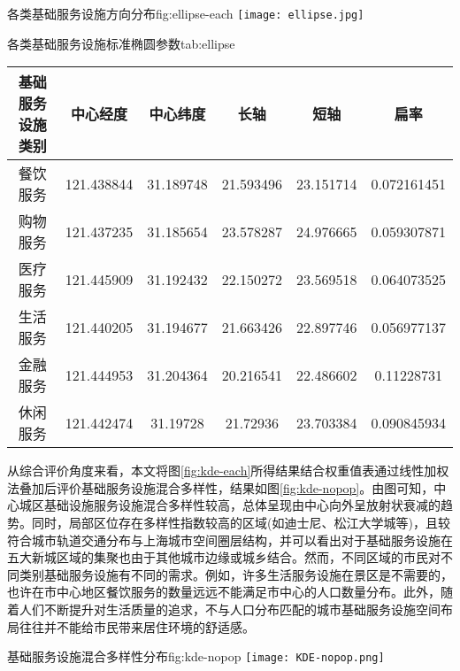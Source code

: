 \documentclass{shnuthesis}
\begin{document}
\begin{generalfig}[htb]{各类基础服务设施方向分布}{fig:ellipse-each}
	\texttt{[image: ellipse.jpg]}
	\setlength{\belowcaptionskip}{1em}   %
\end{generalfig}

\begin{generaltab}[htb]{各类基础服务设施标准椭圆参数}{tab:ellipse}
	\begin{tabularx}{0.92\textwidth}{cccccc}
		\toprule[1.5pt]
		基础服务设施类别 & 中心经度       & 中心纬度      & 长轴       & 短轴       & 扁率          \\
		\midrule
		餐饮服务     & 121.438844 & 31.189748 & 21.593496 & 23.151714 & 0.072161451 \\
		购物服务     & 121.437235 & 31.185654 & 23.578287 & 24.976665 & 0.059307871 \\
		医疗服务     & 121.445909 & 31.192432 & 22.150272 & 23.569518 & 0.064073525 \\
		生活服务     & 121.440205 & 31.194677 & 21.663426 & 22.897746 & 0.056977137 \\
		金融服务     & 121.444953 & 31.204364 & 20.216541 & 22.486602 & 0.11228731  \\
		休闲服务     & 121.442474 & 31.19728  & 21.72936  & 23.703384 & 0.090845934 \\
		\bottomrule[1.5pt]
	\end{tabularx}
\end{generaltab}


从综合评价角度来看，本文将图\ref{fig:kde-each}所得结果结合权重值表通过线性加权法叠加后评价基础服务设施混合多样性，结果如图\ref{fig:kde-nopop}。由图可知，中心城区基础设施服务设施混合多样性较高，总体呈现由中心向外呈放射状衰减的趋势。同时，局部区位存在多样性指数较高的区域(如迪士尼、松江大学城等)，且较符合城市轨道交通分布与上海城市空间圈层结构，并可以看出对于基础服务设施在五大新城区域的集聚也由于其他城市边缘或城乡结合。然而，不同区域的市民对不同类别基础服务设施有不同的需求。例如，许多生活服务设施在景区是不需要的，也许在市中心地区餐饮服务的数量远远不能满足市中心的人口数量分布。此外，随着人们不断提升对生活质量的追求，不与人口分布匹配的城市基础服务设施空间布局往往并不能给市民带来居住环境的舒适感。

\begin{generalfig}[htb]{基础服务设施混合多样性分布}{fig:kde-nopop}
	\texttt{[image: KDE-nopop.png]}
\end{generalfig}
\end{document}
